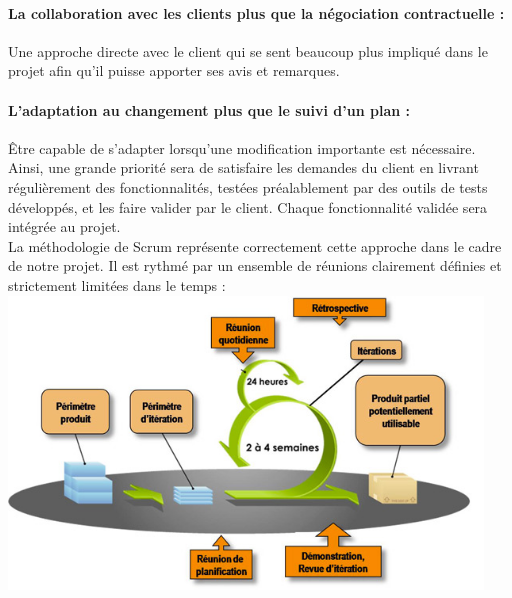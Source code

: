 \documentclass[a4paper,11pt,french]{article}
\begin{document}
\paragraph{La collaboration avec les clients plus que la négociation contractuelle :}
Une approche directe avec le client qui se sent beaucoup plus impliqué dans le projet afin qu'il puisse apporter ses avis et remarques.

\paragraph{L’adaptation au changement plus que le suivi d’un plan :}
Être capable de s'adapter lorsqu'une modification importante est nécessaire.
\\

Ainsi, une grande priorité sera de satisfaire les demandes du client en livrant régulièrement des fonctionnalités, testées préalablement par des outils de tests développés, et les faire valider par le client. Chaque fonctionnalité validée sera intégrée au projet.\\

La méthodologie de Scrum représente correctement cette approche dans le cadre de notre projet. Il est rythmé par un ensemble de réunions clairement définies et strictement limitées dans le temps :\\

\includegraphics[width=34em]{scrum-agiles.jpg}


\newpage
\end{document}
